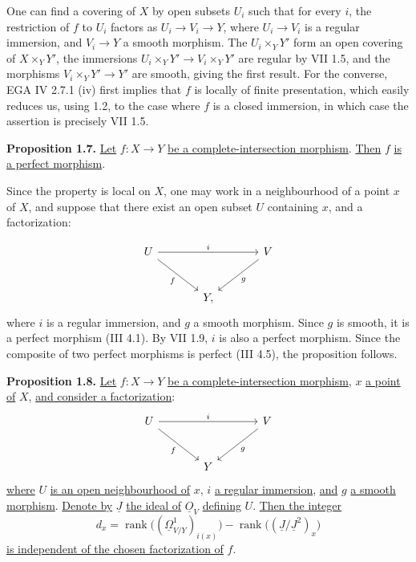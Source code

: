 One can find a covering of $X$ by open subsets $U_i$ such that for every $i$, the restriction of $f$ to $U_i$ factors as $U_i\longrightarrow V_i\longrightarrow Y$, where $U_i\to V_i$ is a regular immersion, and $V_i\to Y$ a smooth morphism. The $U_i\times_Y Y'$ form an open covering of $X\times_Y Y'$, the immersions $U_i\times_Y Y'\longrightarrow V_i\times_Y Y'$ are regular by VII 1.5, and the morphisms $V_i\times_Y Y'\to Y'$ are smooth, giving the first result. For the converse, EGA IV 2.7.1 (iv) first implies that $f$ is locally of finite presentation, which easily reduces us, using 1.2, to the case where $f$ is a closed immersion, in which case the assertion is precisely VII 1.5.

\textbf{Proposition 1.7.} \uline{Let} $f:X\to Y$ \uline{be a complete-intersection morphism}. \uline{Then} $f$ \uline{is a perfect morphism}.

Since the property is local on $X$, one may work in a neighbourhood of a point $x$ of $X$, and suppose that there exist an open subset $U$ containing $x$, and a factorization:

%
\[
\begin{tikzcd}[column sep=large,row sep=large]
U \arrow[rr,"i"] \arrow[dr,"f"'] && V \arrow[dl,"g"]\\
& Y, &
\end{tikzcd}
\]
where $i$ is a
regular immersion, and $g$ a smooth morphism. Since $g$ is smooth, it is a perfect morphism (III 4.1). By VII 1.9, $i$ is also a perfect morphism. Since the composite of two perfect morphisms is perfect (III 4.5), the proposition follows.

\textbf{Proposition 1.8.} \uline{Let} $f:X\to Y$ \uline{be a complete-intersection morphism}, $x$ \uline{a point of} $X$, \uline{and consider a factorization}:
\[
\begin{tikzcd}[column sep=large,row sep=large]
U \arrow[rr,"i"] \arrow[dr,"f"'] && V \arrow[dl,"g"]\\
& Y &
\end{tikzcd}
\]
\uline{where} $U$ \uline{is an open neighbourhood of} $x$, $i$ \uline{a regular immersion}, \uline{and} $g$ \uline{a smooth morphism}. \uline{Denote by} $\underline{J}$ \uline{the ideal of} $\underline{O}_V$ \uline{defining} $U$. \uline{Then the integer}
\[
d_x=\operatorname{rank}\bigl((\underline{\Omega}^1_{V/Y})_{i(x)}\bigr)-\operatorname{rank}\bigl((\underline{J}/\underline{J}^2)_x\bigr)
\]
\uline{is independent of the chosen factorization of} $f$.

